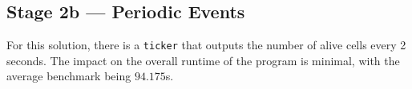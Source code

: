 \documentclass[10pt,a4paper,dvipsnames,cmyk]{scrartcl}
\begin{document}
\subsection*{Stage 2b --- Periodic Events}%
\label{sub:periodic-events}


For this solution, there is a \texttt{ticker} that outputs the number of
alive cells every 2 seconds. The impact on the overall runtime of the
program is minimal, with the average benchmark being $94.175$s.
\end{document}
